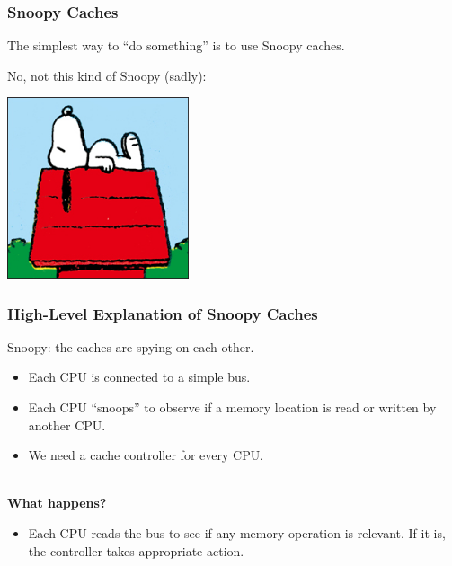 \begin{frame}
\frametitle{Snoopy Caches}
\Large

The simplest way to ``do something''
is to use Snoopy caches. 

No, not this kind of Snoopy (sadly):

\begin{center}
	\includegraphics[width=0.4\textwidth]{images/peanuts-snoopy1.jpg}
\end{center}



\end{frame}

\begin{frame}
  \frametitle{High-Level Explanation of Snoopy Caches}
\Large

  Snoopy: the caches are spying on each other.
  
  \begin{itemize}
    \item Each CPU is connected to a simple bus.
    \item Each CPU ``snoops'' to observe if a memory location is read or written
      by another CPU.
    \item We need a cache controller for every CPU.
  \end{itemize}
  ~\\
  {\bf What happens?}

  \begin{itemize}
    \item Each CPU reads the bus to see if any memory operation is relevant. If
      it is, the controller takes appropriate action.
  \end{itemize}
  
\end{frame}

